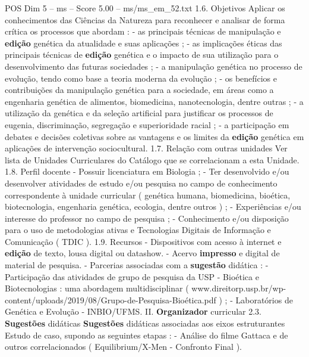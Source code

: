 \begin{textsample}{POS Dim 5 – ms – Score 5.00 – ms/ms\_em\_52.txt}  \label{ex:f5_pos_218}
1.6.
Objetivos Aplicar os conhecimentos das Ciências da Natureza para reconhecer e analisar de forma crítica os processos que abordam : - as principais técnicas de manipulação e \textbf{edição} genética da atualidade e suas aplicações ; - as implicações éticas das principais técnicas de \textbf{edição} genética e o impacto de sua utilização para o desenvolvimento das futuras sociedades ; - a manipulação genética no processo de evolução, tendo como base a teoria moderna da evolução ; - os benefícios e contribuições da manipulação genética para a sociedade, em áreas como a engenharia genética de alimentos, biomedicina, nanotecnologia, dentre outras ; - a utilização da genética e da seleção artificial para justificar os processos de eugenia, discriminação, segregação e superioridade racial ; - a participação em debates e decisões coletivas sobre as vantagens e os limites da \textbf{edição} genética em aplicações de intervenção sociocultural. 1.7.
Relação com outras unidades Ver lista de Unidades Curriculares do Catálogo que se correlacionam a esta Unidade. 1.8.
Perfil docente - Possuir licenciatura em Biologia ; - Ter desenvolvido e/ou desenvolver atividades de estudo e/ou pesquisa no campo de conhecimento correspondente à unidade curricular ( genética humana, biomedicina, bioética, biotecnologia, engenharia genética, ecologia, dentre outros ) ; - Experiências e/ou interesse do professor no campo de pesquisa ; - Conhecimento e/ou disposição para o uso de metodologias ativas e Tecnologias Digitais de Informação e Comunicação ( TDIC ). 1.9.
Recursos - Dispositivos com acesso à internet e \textbf{edição} de texto, lousa digital ou datashow. - Acervo \textbf{impresso} e digital de material de pesquisa. - Parcerias associadas com a \textbf{sugestão} didática : - Participação das atividades de grupo de pesquisa da USP - Bioética e Biotecnologias : uma abordagem multidisciplinar ( www.direitorp.usp.br/wp-content/uploads/2019/08/Grupo-de-Pesquisa-Bioética.pdf ) ; - Laboratórios de Genética e Evolução - INBIO/UFMS.
II. \textbf{Organizador} curricular 2.3. \textbf{Sugestões} didáticas \textbf{Sugestões} didáticas associadas aos eixos estruturantes Estudo de caso, supondo as seguintes etapas : - Análise do filme Gattaca e de outros correlacionados ( Equilibrium/X-Men - Confronto Final ).

\end{textsample}
